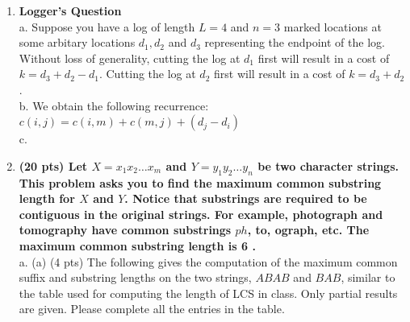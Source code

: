 \documentclass[a4paper,11pt,oneside]{book}
\begin{document}
\begin{enumerate}
  \item {\textbf{Logger's Question}}
  \\ a. Suppose you have a log of length $L=4$ and $n=3$ marked locations at some arbitary locations $d_1, d_2$ and $d_3$ representing the endpoint of the log. Without loss of generality,
  cutting the log at $d_1$ first will result in a cost of $k = d_3 + d_2 - d_1$. Cutting the log at $d_2$ first will result in a cost of $k = d_3 + d_2$. 
  \\ b. We obtain the following recurrence: $c(i, j) = c(i,m) + c(m,j) + (d_j-d_i)$ 
  \\ c.   
  \item {\textbf{(20 pts) Let $X=x_1 x_2 \ldots x_m$ and $Y=y_1 y_2 \ldots y_n$ be two character strings. This problem asks you to find the maximum common substring length for $X$ and $Y$. Notice that substrings are required to be contiguous in the original strings. For example, photograph and tomography have common substrings $p h$, to, ograph, etc. The maximum common substring length is 6 .}}
  \\ a. (a) (4 pts) The following gives the computation of the maximum common suffix and substring lengths on the two strings, $A B A B$ and $B A B$, similar to the table used for computing the length of LCS in class. Only partial results are given. Please complete all the entries in the table.

\end{enumerate}
\end{document}
